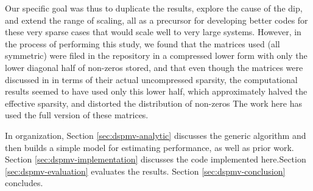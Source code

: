 Our specific goal was thus to duplicate the results, explore the cause of the dip, and extend the range of scaling, all as a precursor for developing better codes for these very sparse cases that would scale well to very large systems. However, in the process of performing this study, we found that the matrices used (all symmetric) were filed in the repository in a compressed lower form with only the lower diagonal half of non-zeros stored, and that even though the matrices were discussed in \cite{techbib:6933066} in terms of their actual uncompressed sparsity, the computational results seemed to have used only this lower half, which approximately halved the effective sparsity, and distorted the distribution of non-zeros  The work here has used the full version of these matrices.

In organization, Section \ref{sec:dspmv-analytic} discusses the generic algorithm and then builds a simple model for estimating performance, as well as prior work. Section \ref{sec:dspmv-implementation} discusses the code implemented here.Section \ref{sec:dspmv-evaluation} evaluates the results. Section \ref{sec:dspmv-conclusion} concludes.
